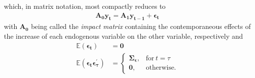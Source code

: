 \documentclass[a4paper,11pt,listof=nochaptergap,oneside,pointednumbers,bibtotoc,bigheadings,liststotoc]{scrbook}
\newcommand{\vect}[1]{\boldsymbol{\mathbf{#1}}}
\begin{document}
which, in matrix notation, most compactly reduces to 
\begin{equation} \label{eq:svar4}
\begin{split}
	\vect{A_0 y_t} = \vect{A_1}\vect{y_{t-1}} + \vect{\epsilon_t}
\end{split}								
\end{equation}
with $\vect{A_0}$ being called the \textit{impact matrix} containing the contemporaneous effects of the increase of each endogenous variable on the other variable, respectively and
\begin{equation}
\begin{split}
	\mathbb{E}(\vect{\epsilon_t}) &  = \vect{0}  \\
	\mathbb{E}(\vect{\epsilon_t}\vect{\epsilon_{\tau}^'})  & =     \begin{cases}
      												\vect{\Sigma_\epsilon}, & \text{for}\ t = \tau \\
      												\vect{0}, & \text{otherwise.}
   								  \end{cases}
\end{split}								
\end{equation}
\end{document}
